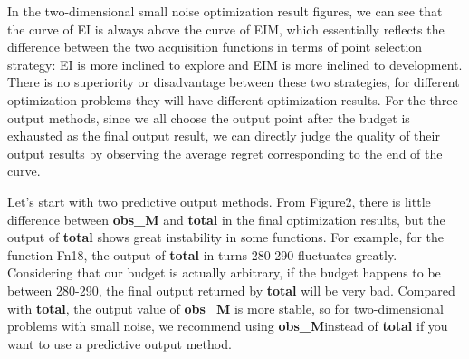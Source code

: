 \documentclass{article}
\begin{document}
\hspace{2em}In the two-dimensional small noise optimization result figures, we can see that the curve of EI is always above the curve of EIM, which essentially reflects the difference between the two acquisition functions in terms of point selection strategy: EI is more inclined to explore and EIM is more inclined to development. There is no superiority or disadvantage between these two strategies, for different optimization problems they will have different optimization results. For the three output methods, since we all choose the output point after the budget is exhausted as the final output result, we can directly judge the quality of their output results by observing the average regret corresponding to the end of the curve.

\hspace{2em}Let's start with two predictive output methods. From Figure2, there is little difference between \textbf{obs\_M} and \textbf{total} in the final optimization results, but the output of \textbf{total} shows great instability in some functions. For example, for the function Fn18, the output of \textbf{total} in turns 280-290 fluctuates greatly. Considering that our budget is actually arbitrary, if the budget happens to be between 280-290, the final output returned by \textbf{total} will be very bad. Compared with \textbf{total}, the output value of \textbf{obs\_M} is more stable, so for two-dimensional problems with small noise, we recommend using \textbf{obs\_M}instead of \textbf{total} if you want to use a predictive output method.
\end{document}
